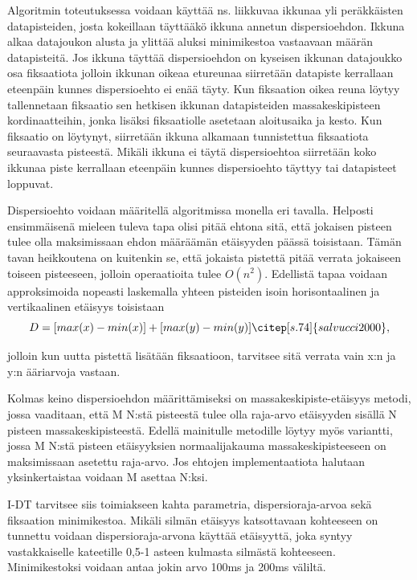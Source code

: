 Algoritmin toteutuksessa voidaan käyttää ns. liikkuvaa ikkunaa yli peräkkäisten datapisteiden, josta kokeillaan täyttääkö ikkuna annetun dispersioehdon. Ikkuna alkaa datajoukon alusta ja ylittää aluksi minimikestoa vastaavaan määrän datapisteitä. Jos ikkuna täyttää dispersioehdon on kyseisen ikkunan datajoukko osa fiksaatiota jolloin ikkunan oikeaa etureunaa siirretään datapiste kerrallaan eteenpäin kunnes dispersioehto ei enää täyty. Kun fiksaation oikea reuna löytyy tallennetaan fiksaatio sen hetkisen ikkunan datapisteiden massakeskipisteen kordinaatteihin, jonka lisäksi fiksaatiolle asetetaan aloitusaika ja kesto. Kun fiksaatio on löytynyt, siirretään ikkuna alkamaan tunnistettua fiksaatiota seuraavasta pisteestä. Mikäli ikkuna ei täytä dispersioehtoa siirretään koko ikkunaa piste kerrallaan eteenpäin kunnes dispersioehto täyttyy tai datapisteet loppuvat. \citep[s.26-27]{gale1984}

Dispersioehto voidaan määritellä algoritmissa monella eri tavalla. Helposti ensimmäisenä mieleen tuleva tapa olisi pitää ehtona sitä, että jokaisen pisteen tulee olla maksimissaan ehdon määräämän etäisyyden päässä toisistaan. Tämän tavan heikkoutena on kuitenkin se, että jokaista pistettä pitää verrata jokaiseen toiseen pisteeseen, jolloin operaatioita tulee \(O(n^2)\). \citep[s.111] {shic2008} Edellistä tapaa voidaan approksimoida nopeasti laskemalla yhteen pisteiden isoin horisontaalinen ja vertikaalinen etäisyys toisistaan 
\[
D = [max(x) - min(x)] + [max(y) - min(y)]  \citep[s. 74]{salvucci2000},
\]

jolloin kun uutta pistettä lisätään fiksaatioon, tarvitsee sitä verrata vain x:n ja y:n ääriarvoja vastaan.

Kolmas keino dispersioehdon määrittämiseksi on massakeskipiste-etäisyys metodi, jossa vaaditaan, että M N:stä pisteestä tulee olla raja-arvo etäisyyden sisällä N pisteen massakeskipisteestä. Edellä mainitulle metodille löytyy myös variantti, jossa M N:stä pisteen etäisyyksien normaalijakauma massakeskipisteeseen on maksimissaan asetettu raja-arvo. Jos ehtojen implementaatiota halutaan yksinkertaistaa voidaan M asettaa N:ksi. \citep[s.111] {shic2008}

I-DT tarvitsee siis toimiakseen kahta parametria, dispersioraja-arvoa sekä fiksaation minimikestoa. Mikäli silmän etäisyys katsottavaan kohteeseen on tunnettu voidaan dispersioraja-arvona käyttää etäisyyttä, joka syntyy vastakkaiselle kateetille 0,5-1 asteen kulmasta silmästä kohteeseen. Minimikestoksi voidaan antaa jokin arvo 100ms ja 200ms väliltä. \citep[s. 74]{salvucci2000}

